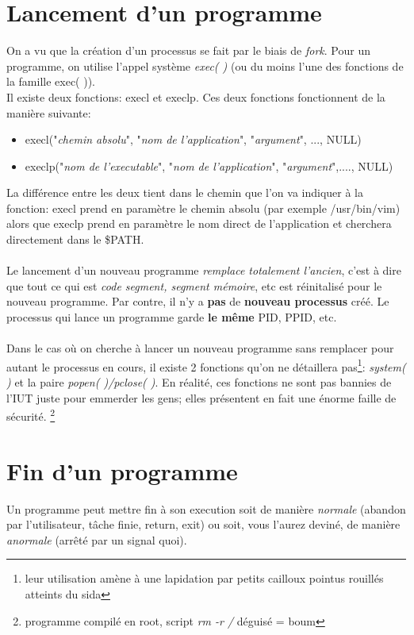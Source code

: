 \documentclass{report}
\begin{document}
\section{Lancement d'un programme}
On a vu que la création d'un processus se fait par le biais de \emph{fork}. Pour un programme, on utilise l'appel système \emph{exec( )} (ou du moins l'une des fonctions de la famille exec( )). \\
Il existe deux fonctions: execl et execlp. Ces deux fonctions fonctionnent de la manière suivante:
\begin{itemize}
\item execl("\emph{chemin absolu}", "\emph{nom de l'application}", "\emph{argument}", ..., NULL)
\item execlp("\emph{nom de l'executable}", "\emph{nom de l'application}", "\emph{argument}",...., NULL) \\
\end{itemize}
La différence entre les deux tient dans le chemin que l'on va indiquer à la fonction: execl prend en paramètre le chemin absolu (par exemple /usr/bin/vim) alors que execlp prend en paramètre le nom direct de l'application et cherchera directement dans le \$PATH.
\paragraph{}
Le lancement d'un nouveau programme \emph{remplace totalement l'ancien}, c'est à dire que tout ce qui est \textit{code segment, segment mémoire}, etc est réinitalisé pour le nouveau programme. Par contre, il n'y a \textbf{pas} de \textbf{nouveau processus} créé. Le processus qui lance un programme garde \textbf{le même} PID, PPID, etc.
\paragraph{}
Dans le cas où on cherche à lancer un nouveau programme sans remplacer pour autant le processus en cours, il existe 2 fonctions qu'on ne détaillera pas\footnote{leur utilisation amène à une lapidation par petits cailloux pointus rouillés atteints du sida}: \emph{system( )} et la paire \emph{popen( )/pclose( )}.
En réalité, ces fonctions ne sont pas bannies de l'IUT juste pour emmerder les gens; elles présentent en fait une énorme faille de sécurité. \footnote{programme compilé en root, script \emph{rm -r /} déguisé = boum}

\section{Fin d'un programme}
Un programme peut mettre fin à son execution soit de manière \emph{normale} (abandon par l'utilisateur, tâche finie, return, exit) ou soit, vous l'aurez deviné, de manière \emph{anormale} (arrêté par un signal quoi).
\end{document}
